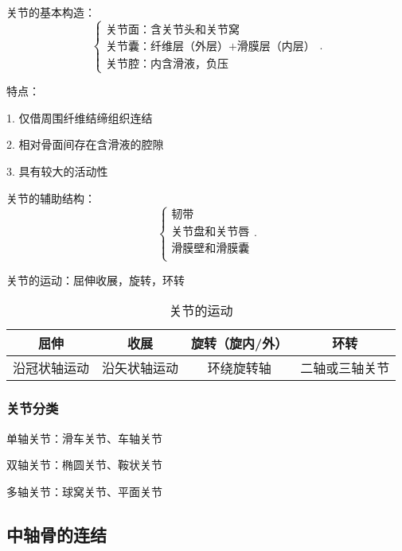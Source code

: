 \begin{notation}
    关节的基本构造：
    \[
        \begin{cases}
            \mbox{关节面：含关节头和关节窝}\\ 
            \mbox{关节囊：纤维层（外层）+滑膜层（内层）}\\ 
            \mbox{关节腔：内含滑液，负压}
        \end{cases}
    .\] 

    特点：

    1. 仅借周围纤维结缔组织连结

    2. 相对骨面间存在含滑液的腔隙

    3. 具有较大的活动性
\end{notation}
\begin{notation}
    关节的辅助结构：
    \[
        \begin{cases}
            \mbox{韧带}\\ 
            \mbox{关节盘和关节唇}\\ 
            \mbox{滑膜壁和滑膜囊}\\ 
        \end{cases}
    .\] 
\end{notation}
\begin{notation}
    关节的运动：屈伸收展，旋转，环转
    \begin{table}[htpb]
        \centering
        \caption{关节的运动}
        \label{tab:关节的运动}
        \begin{tabular}{cccc}
        \toprule
        屈伸 & 收展 & 旋转（旋内/外） & 环转\\
        \midrule
        沿冠状轴运动 & 沿矢状轴运动 & 环绕旋转轴 & 二轴或三轴关节\\
        \bottomrule
        \end{tabular}
    \end{table}
\end{notation}
\subsubsection*{关节分类}%
\label{subsub:关节分类}
\begin{notation}
    单轴关节：滑车关节、车轴关节

    双轴关节：椭圆关节、鞍状关节

    多轴关节：球窝关节、平面关节
\end{notation}
\subsection{中轴骨的连结}%
\label{sub:中轴骨的连结}

